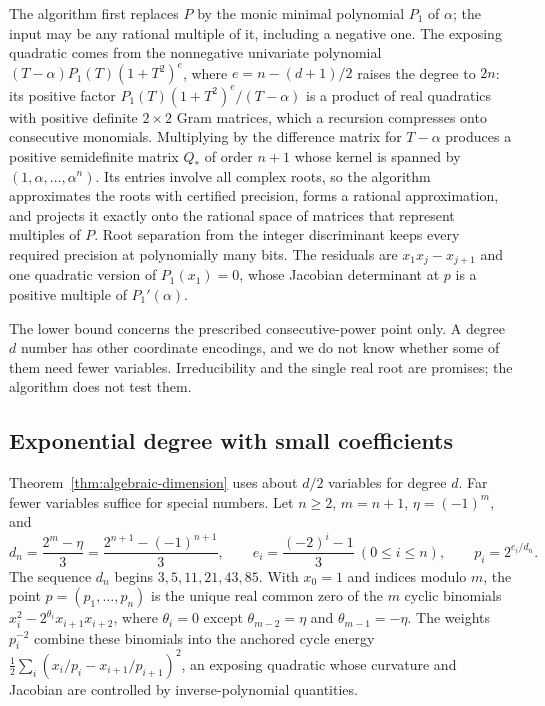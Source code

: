 The algorithm first replaces $P$ by the monic minimal polynomial $P_1$ of
$\alpha$; the input may be any rational multiple of it, including a negative
one. The exposing quadratic comes from the nonnegative univariate polynomial
$(T-\alpha)P_1(T)(1+T^2)^e$, where $e=n-(d+1)/2$ raises the degree to $2n$:
its positive factor $P_1(T)(1+T^2)^e/(T-\alpha)$ is a product of real
quadratics with positive definite $2\times2$ Gram matrices, which a recursion
compresses onto consecutive monomials. Multiplying by the difference matrix
for $T-\alpha$ produces a positive semidefinite matrix $Q_*$ of order $n+1$
whose kernel is spanned by $(1,\alpha,\ldots,\alpha^n)$. Its entries involve
all complex roots, so the algorithm approximates the roots with certified
precision, forms a rational approximation, and projects it exactly onto the
rational space of matrices that represent multiples of $P$. Root separation
from the integer discriminant keeps every required precision at polynomially
many bits. The residuals are $x_1x_j-x_{j+1}$ and one quadratic version of
$P_1(x_1)=0$, whose Jacobian determinant at $p$ is a positive multiple of
$P_1'(\alpha)$.

The lower bound concerns the prescribed consecutive-power point only. A degree
$d$ number has other coordinate encodings, and we do not know whether some of
them need fewer variables. Irreducibility and the single real root are
promises; the algorithm does not test them.

\subsection{Exponential degree with small coefficients}
\label{sec:algebraic-cyclic}

Theorem~\ref{thm:algebraic-dimension} uses about $d/2$ variables for degree
$d$. Far fewer variables suffice for special numbers. Let $n\ge2$, $m=n+1$,
$\eta=(-1)^m$, and
\[
 d_n=\frac{2^m-\eta}{3}=\frac{2^{n+1}-(-1)^{n+1}}3,\qquad
 e_i=\frac{(-2)^i-1}{3}\ (0\le i\le n),\qquad
 p_i=2^{e_i/d_n}.
\]
The sequence $d_n$ begins $3,5,11,21,43,85$. With $x_0=1$ and indices modulo
$m$, the point $p=(p_1,\ldots,p_n)$ is the unique real common zero of the $m$
cyclic binomials $x_i^2-2^{\theta_i}x_{i+1}x_{i+2}$, where $\theta_i=0$ except
$\theta_{m-2}=\eta$ and $\theta_{m-1}=-\eta$. The weights $p_i^{-2}$ combine
these binomials into the anchored cycle energy
$\tfrac12\sum_i(x_i/p_i-x_{i+1}/p_{i+1})^2$, an exposing quadratic whose
curvature and Jacobian are controlled by inverse-polynomial quantities.

